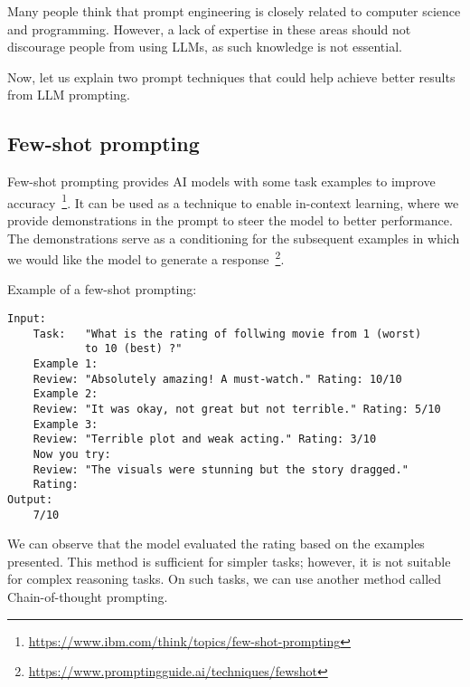 Many people think that prompt engineering is closely related to computer science and programming. However, a lack of expertise in these areas should not discourage people from using LLMs, as such knowledge is not essential.

Now, let us explain two prompt techniques that could help achieve better results from LLM prompting.

\subsection*{Few-shot prompting}
Few-shot prompting provides AI models with some task examples to improve accuracy~\footnote{\url{https://www.ibm.com/think/topics/few-shot-prompting}}. It can be used as a technique to enable in-context learning, where we provide demonstrations in the prompt to steer the model to better performance. The demonstrations serve as a conditioning for the subsequent examples in which we would like the model to generate a response~\footnote{\url{https://www.promptingguide.ai/techniques/fewshot}}.

Example of a few-shot prompting:
\begin{verbatim}
Input:
    Task:   "What is the rating of follwing movie from 1 (worst)
            to 10 (best) ?" 
    Example 1:
    Review: "Absolutely amazing! A must-watch." Rating: 10/10
    Example 2:
    Review: "It was okay, not great but not terrible." Rating: 5/10
    Example 3:
    Review: "Terrible plot and weak acting." Rating: 3/10
    Now you try:
    Review: "The visuals were stunning but the story dragged."
    Rating:
Output:
    7/10
\end{verbatim}

We can observe that the model evaluated the rating based on the examples presented. This method is sufficient for simpler tasks; however, it is not suitable for complex reasoning tasks. On such tasks, we can use another method called Chain-of-thought prompting.

